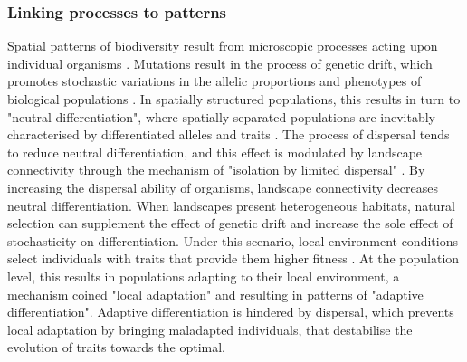 \subsubsection{Linking processes to patterns}
Spatial patterns of biodiversity result from microscopic processes acting upon individual organisms \cite{Champagnat2006}.
% 
Mutations result in the process of genetic drift, which promotes stochastic variations in the allelic proportions and phenotypes of biological populations \cite{XXX}. In spatially structured populations, this results in turn to "neutral differentiation", where spatially separated populations are inevitably characterised by differentiated alleles and traits \cite{XXX}. 
% 
The process of dispersal tends to reduce neutral differentiation, and this effect is modulated by landscape connectivity \cite{Wright1943,McRae2006,McRae2007} through the mechanism of "isolation by limited dispersal" \cite{Orsini2013}. By increasing the dispersal ability of organisms, landscape connectivity decreases neutral differentiation.
% 
When landscapes present heterogeneous habitats, natural selection can supplement the effect of genetic drift and increase the sole effect of stochasticity on differentiation. Under this scenario, local environment conditions select individuals with traits that provide them higher fitness \cite{XXX}. At the population level, this results in populations adapting to their local environment, a mechanism coined "local adaptation" \cite{Kawecki2004} and resulting in patterns of "adaptive differentiation". 
% 
% 
Adaptive differentiation is hindered by dispersal, which prevents local adaptation by bringing maladapted individuals, that destabilise the evolution of traits towards the optimal.
% 
% 
